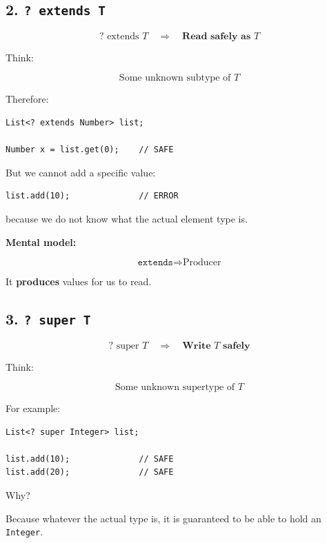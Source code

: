 \documentclass[11pt,a4paper]{book}
\begin{document}

\subsection*{2. \texttt{? extends T}}

\[
? \text{ extends } T
\quad\Rightarrow\quad
\textbf{Read safely as } T
\]

Think:

\[
\boxed{\text{Some unknown subtype of }T}
\]

Therefore:

\begin{verbatim}
List<? extends Number> list;

Number x = list.get(0);    // SAFE
\end{verbatim}

But we cannot add a specific value:

\begin{verbatim}
list.add(10);              // ERROR
\end{verbatim}

because we do not know what the actual element type is.

\textbf{Mental model:}

\[
\boxed{\texttt{extends} \Rightarrow \text{Producer}}
\]

It \textbf{produces} values for us to read.


\subsection*{3. \texttt{? super T}}

\[
? \text{ super } T
\quad\Rightarrow\quad
\textbf{Write }T\textbf{ safely}
\]

Think:

\[
\boxed{\text{Some unknown supertype of }T}
\]

For example:

\begin{verbatim}
List<? super Integer> list;

list.add(10);              // SAFE
list.add(20);              // SAFE
\end{verbatim}

Why?

Because whatever the actual type is, it is guaranteed to be able
to hold an \texttt{Integer}.
\end{document}
